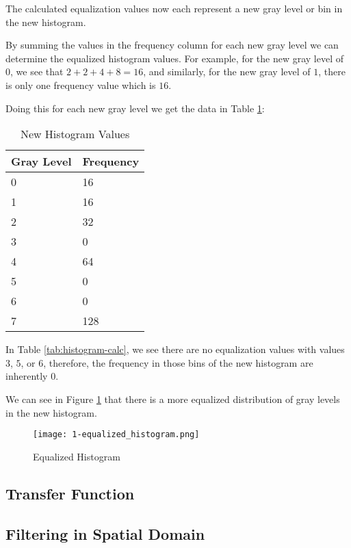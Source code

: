 \documentclass[12pt, letterpaper]{article}
\begin{document}
The calculated equalization values now each represent a new gray level or bin in the new histogram.

By summing the values in the frequency column for each new gray level we can determine the equalized histogram values. For example, for the new gray level of $0$, we see that  $2+2+4+8=16$, and similarly, for the new gray level of $1$, there is only one frequency value which is $16$.

Doing this for each new gray level we get the data in Table \ref{tab:new-histogram}:

\begin{table}[H]
    \centering
    \begin{tabular}{|l|l|}
    \hline
        Gray Level & Frequency  \\ \hline
        0 & 16  \\ 
        1 & 16  \\ 
        2 & 32  \\ 
        3 & 0  \\ 
        4 & 64  \\ 
        5 & 0  \\ 
        6 & 0  \\ 
        7 & 128 \\ \hline
    \end{tabular}
    \caption{New Histogram Values}
    \label{tab:new-histogram}    
\end{table}

In Table \ref{tab:histogram-calc}, we see there are no equalization values with values $3$, $5$, or $6$, therefore, the frequency in those bins of the new histogram are inherently 0.

We can see in Figure \ref{fig:equalized-histogram} that there is a more equalized distribution of gray levels in the new histogram.


\begin{figure}[H]
    \centering
    \texttt{[image: 1-equalized\_histogram.png]}
    \caption{Equalized Histogram}
    \label{fig:equalized-histogram}
\end{figure}


\subsection{Transfer Function}



\subsection{Filtering in Spatial Domain}
\end{document}
